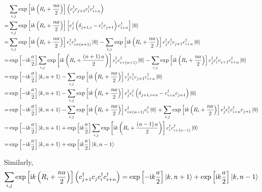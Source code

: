 \documentclass[a4paper, 11pt]{report}
\newcommand{\I}{\mathrm{i}}
\begin{document}
\begin{displaymath}
\begin{split}
&\sum_{i,j}\exp\left[\I k \left(R_i + \frac{na}{2}\right)\right]\left(c^{\dagger}_{j} c^{}_{j+1} c^{\dagger}_{i} c^{\dagger}_{i + n} \right)\\
=& \sum_{i,j}\exp\left[\I k \left(R_i + \frac{na}{2}\right)\right]\left[c^{\dagger}_{j} \left( \delta^{}_{j+1,i}-c^{\dagger}_{i}c^{}_{j+1}\right)   c^{\dagger}_{i + n} \right]\ket{0}\\
=& \sum_{i,j}\exp\left[\I k \left(R_i + \frac{na}{2}\right)\right]c ^{\dagger}_{i}c^{\dagger}_{i+\left( n+1\right) }\ket{0} - \sum_{i,j}\exp\left[\I k \left(R_i + \frac{na}{2}\right)\right]c^{\dagger}_{j} c^{\dagger}_{i} c^{}_{j+1} c^{\dagger}_{i+n} \ket{0}\\
=&\exp\left[-\I k \frac{a}{2}\right]\sum_{i,j}\exp\left[\I k \left(R_i + \frac{\left( n+1\right) a}{2}\right)\right]c ^{\dagger}_{i}c^{\dagger}_{i+\left( n+1\right) }\ket{0} - \sum_{i,j}\exp\left[\I k \left(R_i + \frac{na}{2}\right)\right]c^{\dagger}_{j} c^{\dagger}_{i} c^{}_{j+1} c^{\dagger}_{i+n} \ket{0}\\
=& \exp\left[-\I k \frac{a}{2}\right] \ket{k, n + 1} - \sum_{i,j}\exp\left[\I k \left(R_i + \frac{na}{2}\right)\right]c^{\dagger}_{j} c^{\dagger}_{i} c^{}_{j+1} c^{\dagger}_{i+n} \ket{0}\\
=& \exp\left[-\I k \frac{a}{2}\right] \ket{k, n + 1} - \sum_{i,j}\exp\left[\I k \left(R_i + \frac{na}{2}\right)\right]c^{\dagger}_{j}c^{\dagger}_{i} \left( \delta^{}_{j+1,i+n} - c^{\dagger}_{i+n}c^{}_{j+1}\right) \ket{0}\\
=& \exp\left[-\I k \frac{a}{2}\right] \ket{k, n + 1} - \sum_{i,j}\exp\left[\I k \left(R_i + \frac{na}{2}\right)\right]c^{\dagger}_{i + \left( n - 1\right) }c^{\dagger}_{i}\ket{0} + \sum_{i,j}\exp\left[\I k \left(R_i + \frac{na}{2}\right)\right]c^{\dagger}_{j}c^{\dagger}_{i}c^{\dagger}_{i+n}c^{}_{j+1}\ket{0}\\
=& \exp\left[-\I k \frac{a}{2}\right] \ket{k, n + 1} + \exp\left[\I k \frac{a}{2}\right] \sum_{i,j}\exp\left[\I k \left(R_i + \frac{\left( n-1\right) a}{2}\right)\right]c^{\dagger}_{i}c^{\dagger}_{i + \left( n - 1\right) }\ket{0}\\
=& \exp\left[-\I k \frac{a}{2}\right] \ket{k, n + 1} + \exp\left[\I k \frac{a}{2}\right] \ket{k, n - 1}
\end{split}
\end{displaymath}

Similarly,
\begin{displaymath}
\sum_{i,j}\exp\left[\I k \left(R_i + \frac{na}{2}\right)\right]\left(c^{\dagger}_{j+1} c^{}_{j} c^{\dagger}_{i} c^{\dagger}_{i + n} \right) = \exp\left[-\I k \frac{a}{2}\right] \ket{k, n + 1} + \exp\left[\I k \frac{a}{2}\right] \ket{k, n - 1}
\end{displaymath}
\end{document}
